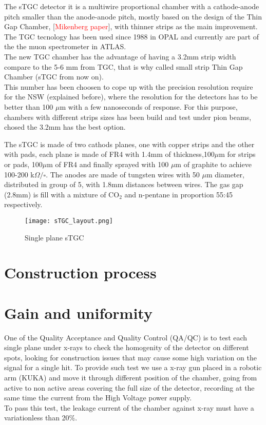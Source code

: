 	The sTGC detector it is a multiwire proportional chamber with a cathode-anode pitch smaller than the anode-anode pitch, mostly based on the design of the Thin Gap Chamber, [\textcolor{red}{Mikenberg paper}], with thinner strips as the main improvement. The TGC tecnology has been used since 1988 in OPAL and currently are part of the the muon spectrometer in ATLAS. \\
	The new TGC chamber has the advantage of having a 3.2mm strip width compare to the 5-6 mm from TGC, that is why called small strip Thin Gap Chamber (sTGC from now on).\\ 
	This number has been choosen to cope up with the precision resolution require for the NSW (explained before), where the resolution for the detectors has to be better than 100 $\mu$m with a few nanoseconds of response. For this purpose, chambers with different strips sizes has been build and test under pion beams, chosed the 3.2mm has the best option\cite{stripwidth}. \par


The sTGC is made of two cathods planes, one with copper strips and the other with pads, each plane is made of FR4 with 1.4mm of thickness,100$\mu$m for strips or pads, 100$\mu$m of FR4 and finally sprayed with 100 $\mu$m of graphite to achieve 100-200 k$\Omega / \square$. The anodes are made of tungsten wires with 50 $\mu$m diameter, distributed in group of 5, with 1.8mm distances between wires. The gas gap (2.8mm) is fill with a mixture of CO$_2$ and n-pentane in proportion 55:45 respectively.  

\begin{figure}[h]
		\centering
		\texttt{[image: sTGC\_layout.png]}
		\caption{Single plane sTGC}\label{fig:sTGC}
\end{figure}


\section{Construction process}

\section{Gain and uniformity}

One of the Quality Acceptance and Quality Control (QA/QC) is to test each single plane under x-rays to check the homogenity of the detector on different spots, looking for construction issues that may cause some high variation on the signal for a single hit. To provide such test we use a x-ray gun placed in a robotic arm (KUKA) and move it through different position of the chamber, going from active to non active areas covering the full size of the detector, recording at the same time the current from the High Voltage power supply.\\
To pass this test, the leakage current of the chamber against x-ray must have a variationless than 20\%.\par

